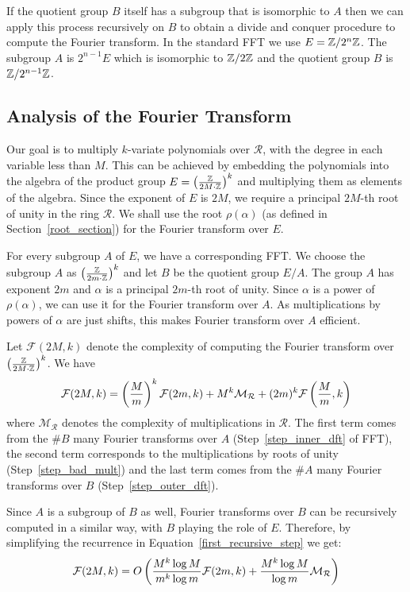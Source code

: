 \documentclass[11pt]{article}
\renewcommand{\R}{\mathcal{R}} %
\renewcommand{\F}{\mathcal{F}} %
\newcommand{\mr}{\mathcal{M}_\mathcal{R}} %
\begin{document}
If the quotient group $B$ itself has a subgroup that is isomorphic to
$A$ then we can apply this process recursively on $B$ to obtain a
divide and conquer procedure to compute the Fourier transform. In the
standard FFT we use $E = \mathbb{Z}/2^n\mathbb{Z}$. The subgroup $A$ is $2^{n-1}E$
which is isomorphic to $\mathbb{Z}/2\mathbb{Z}$ and the quotient group $B$ is
$\mathbb{Z}/2^{n-1}\mathbb{Z}$.

\subsection{Analysis of the Fourier Transform}\label{fourier_analysis}

Our goal is to multiply $k$-variate polynomials over $\R$, with the
degree in each variable less than $M$. This can be achieved by
embedding the polynomials into the algebra of the product group $E =
\left(\frac{\mathbb{Z}}{2M\cdot \mathbb{Z}}\right)^k$ and multiplying them as elements of
the algebra. Since the exponent of $E$ is $2M$, we require a principal
$2M$-th root of unity in the ring $\R$. We shall use the root
$\rho(\alpha)$ (as defined in Section~\ref{root_section}) for the
Fourier transform over $E$.

For every subgroup $A$ of $E$, we have a corresponding FFT. We choose
the subgroup $A$ as $\left(\frac{\mathbb{Z}}{2m\cdot \mathbb{Z}}\right)^k$ and let $B$ be
the quotient group $E/A$. The group $A$ has exponent $2m$ and $\alpha$
is a principal $2m$-th root of unity. Since $\alpha$ is a power of
$\rho(\alpha)$, we can use it for the Fourier transform over $A$. As
multiplications by powers of $\alpha$ are just shifts, this makes
Fourier transform over $A$ efficient.

Let $\F(2M,k)$ denote the complexity of computing the Fourier transform
over $\left(\frac{\mathbb{Z}}{2M\cdot \mathbb{Z}}\right)^k$. We have
\begin{equation}
\F(2M,k) = \inparen{\frac{M}{m}}^k \F(2m,k) + M^k
\mathcal{M}_\R+(2m)^k\F\inparen{\frac{M}{m},k}
\label{first_recursive_step}
\end{equation}
where $\mathcal{M}_\R$ denotes the complexity of multiplications in
$\R$. The first term comes {}from the $\# B$ many Fourier transforms
over $A$ (Step~\ref{step_inner_dft} of FFT), the second term
corresponds to the multiplications by roots of unity
(Step~\ref{step_bad_mult}) and the last term comes {}from the $\# A$
many Fourier transforms over $B$ (Step~\ref{step_outer_dft}).

Since $A$ is a subgroup of $B$ as well, Fourier transforms over $B$
can be recursively computed in a similar way, with $B$ playing the
role of $E$. Therefore, by simplifying the recurrence in
Equation~\ref{first_recursive_step} we get:
\begin{equation}
\F(2M,k) = O\inparen{\frac{M^k\log M}{m^k\log m}\F(2m,k) +
  \frac{M^k\log M}{\log m}\mr}
\label{eqn_with_Fa}
\end{equation}
\end{document}
